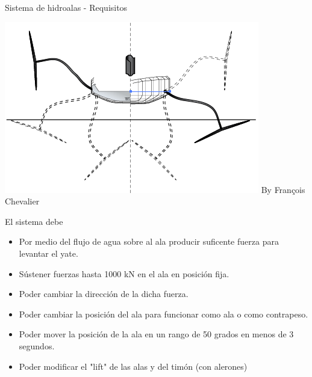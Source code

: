 \documentclass[presentation,aspectratio=169]{beamer}
\begin{document}
\begin{frame}[label={sec:orga72b923}]{Sistema de hidroalas - Requisitos}
\begin{center}
\includegraphics[height=0.2\textheight]{../../figures/AC75-sketch.png}
{\footnotesize  By François Chevalier}
\end{center}

El sistema debe
\begin{itemize}
\item Por medio del flujo de agua sobre al ala producir suficente fuerza para levantar el yate.
\item Sústener fuerzas hasta 1000 kN en el ala en posición fija.
\item Poder cambiar la dirección de la dicha fuerza.
\item Poder cambiar la posición del ala para funcionar como ala o como contrapeso.
\item Poder mover la posición de la ala en un rango de 50 grados en menos de 3 segundos.
\item Poder modificar el "lift" de las alas y del timón (con alerones)
\end{itemize}
\end{frame}
\end{document}
